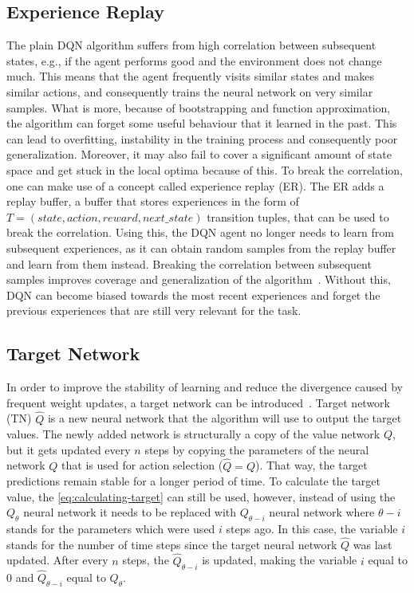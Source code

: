 \documentclass{article}
\begin{document}
\subsection{Experience Replay}
\label{subsec:experience-replay}
The plain DQN algorithm suffers from high correlation between subsequent states, e.g., if the agent performs good and the environment does not change much.
This means that the agent frequently visits similar states and makes similar actions,
and consequently trains the neural network on very similar samples.
What is more, because of bootstrapping and function approximation, the algorithm can forget some useful behaviour that it learned in the past.
This can lead to overfitting, instability in the training process and consequently poor generalization.
Moreover, it may also fail to cover a significant amount of state space and get stuck
in the local optima because of this.
To break the correlation, one can make use of a concept called experience replay (ER).
The ER adds a replay buffer, a buffer that stores experiences in the form of $T=(state, action, reward, next\_state)$ transition tuples, that can be used to break the correlation.
Using this, the DQN agent no longer needs to learn from subsequent experiences, as it can obtain random samples
from the replay buffer and learn from them instead.
Breaking the correlation between subsequent samples improves coverage and generalization of the algorithm~\cite{DBLP:books/sp/Plaat22}.
Without this, DQN can become biased towards the most recent experiences and forget the previous experiences
that are still very relevant for the task.

\subsection{Target Network}
\label{subsec:target-network}
In order to improve the stability of learning and reduce the divergence caused by frequent weight updates,
a target network can be introduced~\cite{DBLP:books/sp/Plaat22}.
Target network (TN) $\hat Q$ is a new neural network that the algorithm will use to output the target values.
The newly added network is structurally a copy of the value network $Q$, but it gets updated every $n$ steps
by copying the parameters of the neural network $Q$ that is used for action selection ($\hat Q = Q$).
That way, the target predictions remain stable for a longer period of time.
To calculate the target value, the \autoref{eq:calculating-target} can still be used, however, instead of using the $Q_\theta$
neural network it needs to be replaced with $Q_{\theta - i}$ neural network where $\theta - i$ stands for the parameters
which were used $i$ steps ago.
In this case, the variable $i$ stands for the number of time steps since the target neural network $\hat Q$ was last updated.
After every $n$ steps, the $\hat Q_{\theta - i}$ is updated, making the variable $i$ equal to 0 and $\hat Q_{\theta - i}$
equal to $Q_\theta$.
\end{document}
